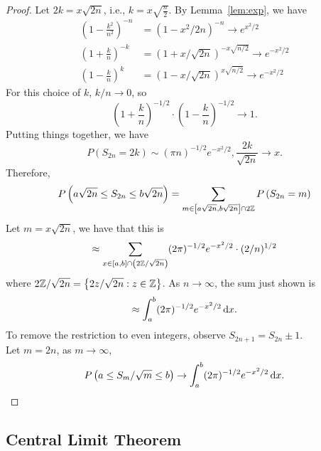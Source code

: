 \begin{proof}
	Let \(2k=x\sqrt{2n}\), i.e., \(k=x\sqrt{\frac{n}{2}}\). By Lemma~\ref{lem:exp}, we have
	\begin{equation*}
		\begin{aligned}
			\left(1-\frac{k^{2}}{n^{2}}\right)^{-n} & =\left(1-x^{2} / 2 n\right)^{-n} \rightarrow e^{x^{2} / 2}       \\
			\left(1+\frac{k}{n}\right)^{-k}         & =(1+x / \sqrt{2 n})^{-x \sqrt{n / 2}} \rightarrow e^{-x^{2} / 2} \\
			\left(1-\frac{k}{n}\right)^{k}          & =(1-x / \sqrt{2 n})^{x \sqrt{n / 2}} \rightarrow e^{-x^{2} / 2}
		\end{aligned}
	\end{equation*}
	For this choice of \(k\), \(k/n \rightarrow 0\), so
	\begin{equation*}
		\left(1+\frac{k}{n}\right)^{-1 / 2} \cdot\left(1-\frac{k}{n}\right)^{-1 / 2} \rightarrow 1.
	\end{equation*}
	Putting things together, we have
	\begin{equation*}
		P\left(S_{2 n}=2 k\right) \sim (\pi n)^{-1 / 2} e^{-x^{2} / 2},\frac{2k}{\sqrt{2n}} \rightarrow x.
	\end{equation*}
	Therefore,
	\begin{equation*}
		P\left( a\sqrt{2n} \leq S_{2 n} \leq b\sqrt{2 n} \right) = \sum_{m \in \left[a\sqrt{2 n},b\sqrt{2 n}\right] \cap 2\mathbb{Z}} P\left(S_{2 n}=m\right)
	\end{equation*}
	Let \(m=x\sqrt{2 n}\), we have that this is
	\begin{equation*}
		\approx \sum_{x \in \left[a,b\right] \cap \left(2\mathbb{Z} / \sqrt{2 n}\right)}(2 \pi)^{-1 / 2} e^{-x^{2} / 2}\cdot(2/n)^{1/2}
	\end{equation*}
	where \(2\mathbb{Z} / \sqrt{2 n} = \left\{2z/\sqrt{2n} : z\in\mathbb{Z}\right\}\). As \(n\rightarrow\infty\), the sum just shown is
	\begin{equation*}
		\approx \int_{a}^{b}(2 \pi)^{-1 / 2} e^{-x^{2} / 2} \mathop{}\!\mathrm{d} x.
	\end{equation*}
	To remove the restriction to even integers, observe \(S_{2 n +1}=S_{2 n} \pm 1\).\\
	Let \(m=2n\), as \(m\rightarrow\infty\),
	\begin{equation*}
		P\left(a \leq S_{m} / \sqrt{m} \leq b\right) \rightarrow \int_{a}^{b}(2 \pi)^{-1 / 2} e^{-x^{2} / 2} \mathop{}\!\mathrm{d} x.
	\end{equation*}
\end{proof}

\subsection{Central Limit Theorem}

